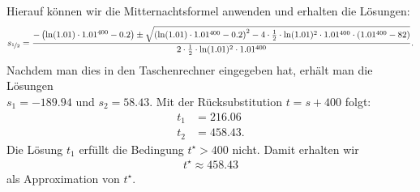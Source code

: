 Hierauf können wir die Mitternachtsformel anwenden und erhalten die Lösungen:
\begin{align*}
	s_{\nicefrac{1}{2}}
	=
	\frac{-\left(\ln(1.01) \cdot  1.01^{400}- 0.2\right) \pm 
	\sqrt{\left(\ln(1.01) \cdot  1.01^{400}- 0.2\right)^2 -
		4 \cdot \frac{1}{2} \cdot  \ln(1.01)^2 \cdot 1.01^{400} \cdot (1.01^{400} - 82 )}}
	{2 \cdot \frac{1}{2} \cdot  \ln(1.01)^2 \cdot 1.01^{400 }}.
\end{align*}
Nachdem man dies in den Taschenrechner eingegeben hat, erhält man die Lösungen\\
$ s_1 = -189.94 $ und $ s_2 = 58.43 $.
Mit der Rücksubstitution $ t = s + 400 $ folgt:
\begin{align*}
	t_1 &= 216.06\\
	t_2 &= 458.43.
\end{align*}
Die Lösung $ t_1 $ erfüllt die Bedingung $ t^\star > 400  $ nicht. Damit erhalten wir
\begin{align*}
	t^\star \approx 458.43
\end{align*}  
als Approximation von $ t^\star $.
\newpage
